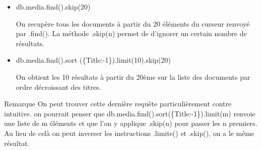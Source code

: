 {\let\thefootnote\relax{}}
    \begin{itemize}
        \item \begin{tt} db.media.find().skip(20) \end{tt} \newline
        On recupère tous les documents à partir du 20 éléments du curseur renvoyé par .find(). La méthode .skip(n) permet de d'ignorer un certain nombre de résultats.
        \item \begin{tt} db.media.find().sort (\{Title:-1\}).limit(10).skip(20) \end{tt} \newline
        On obtient les 10 résultats à partir du 20ème sur la liste des documents par ordre décroissant des titres.
    \end{itemize}
    \begin{block}{Remarque}
        On peut trouver cette dernière requête particulièrement contre intuitive. on pourrait penser que db.media.find().sort(\{Title:-1\}).limit(m) renvoie une liste de m éléments et que l'on y applique .skip(n) pour passer les n premiers. Au lieu de celà on peut inverser les instructions .limite() et .skip(), on a le même résultat.
    \end{block}